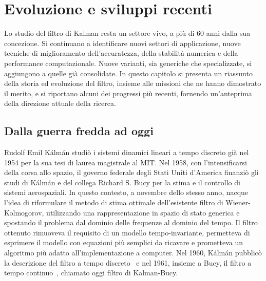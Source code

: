 \documentclass[12pt,a4paper,openright,twoside]{book}
\begin{document}



\iffalse %
\chapter{Evoluzione e sviluppi recenti}

Lo studio del filtro di Kalman resta un settore vivo, a più di 60 anni dalla sua concezione. Si continuano a identificare nuovi settori di applicazione, nuove tecniche di miglioramento dell'accuratezza, della stabilità numerica e della performance computazionale. Nuove varianti, sia generiche che specializzate, si aggiungono a quelle già consolidate. In questo capitolo si presenta un riassunto della storia ed evoluzione del filtro, insieme alle missioni che ne hanno dimostrato il merito, e si riportano alcuni dei progressi più recenti, fornendo un'anteprima della direzione attuale della ricerca.

\section{Dalla guerra fredda ad oggi}

Rudolf Emil Kálmán studiò i sistemi dinamici lineari a tempo discreto già nel 1954 per la sua tesi di laurea magistrale al MIT. Nel 1958, con l'intensificarsi della corsa allo spazio, il governo federale degli Stati Uniti d'America finanziò gli studi di Kálmán e del collega Richard S. Bucy per la stima e il controllo di sistemi aerospaziali. In questo contesto, a novembre dello stesso anno, nacque l'idea di riformulare il metodo di stima ottimale dell'esistente filtro di Wiener-Kolmogorov, utilizzando una rappresentazione in spazio di stato generica e spostando il problema dal dominio delle frequenze al dominio del tempo. Il filtro ottenuto rimuoveva il requisito di un modello tempo-invariante, permetteva di esprimere il modello con equazioni più semplici da ricavare e prometteva un algoritmo più adatto all'implementazione a computer.
Nel 1960, Kálmán pubblicò la descrizione del filtro a tempo discreto~\cite{10.1115/1.3662552} e nel 1961, insieme a Bucy, il filtro a tempo continuo~\cite{10.1115/1.3658902}, chiamato oggi filtro di Kalman-Bucy.
\end{document}
